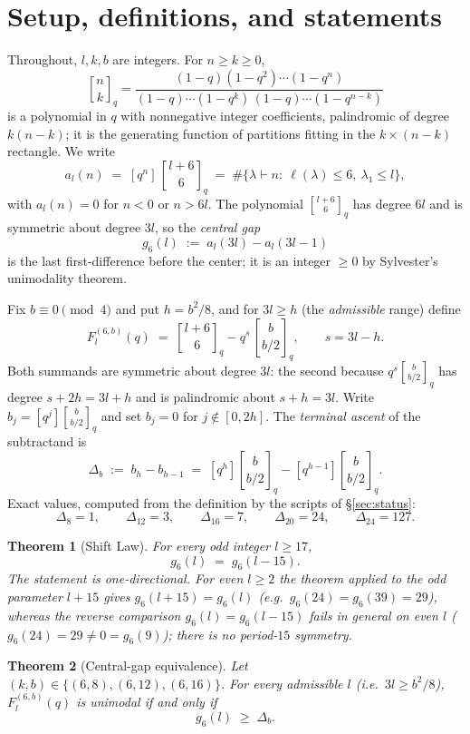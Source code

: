 \documentclass[11pt,reqno]{article}
\newtheorem{theorem}{Theorem}
\theoremstyle{definition}
\newcommand{\ggbrack}[2]{\genfrac{[}{]}{0pt}{}{#1}{#2}_q}
\begin{document}
\section{Setup, definitions, and statements}\label{sec:setup}
Throughout, $l,k,b$ are integers. For $n\ge k\ge 0$,
\[
\ggbrack{n}{k}=\frac{(1-q)(1-q^2)\cdots(1-q^{n})}{(1-q)\cdots(1-q^{k})\,(1-q)\cdots(1-q^{n-k})}
\]
is a polynomial in $q$ with nonnegative integer coefficients, palindromic of degree $k(n-k)$; it is the generating function of partitions fitting in the $k\times(n-k)$ rectangle. We write
\[
a_l(n)\;=\;[q^n]\,\ggbrack{l+6}{6}\;=\;\#\{\lambda\vdash n:\ \ell(\lambda)\le 6,\ \lambda_1\le l\},
\]
with $a_l(n)=0$ for $n<0$ or $n>6l$. The polynomial $\ggbrack{l+6}{6}$ has degree $6l$ and is symmetric about degree $3l$, so the \emph{central gap}
\[
g_6(l)\;:=\;a_l(3l)-a_l(3l-1)
\]
is the last first-difference before the center; it is an integer $\ge 0$ by Sylvester's unimodality theorem.

Fix $b\equiv 0\pmod 4$ and put $h=b^2/8$, and for $3l\ge h$ (the \emph{admissible} range) define
\[
F^{(6,b)}_l(q)\;=\;\ggbrack{l+6}{6}-q^{s}\,\ggbrack{b}{b/2},\qquad s=3l-h .
\]
Both summands are symmetric about degree $3l$: the second because $q^s\ggbrack{b}{b/2}$ has degree $s+2h=3l+h$ and is palindromic about $s+h=3l$. Write $b_j=[q^j]\ggbrack{b}{b/2}$ and set $b_j=0$ for $j\notin[0,2h]$. The \emph{terminal ascent} of the subtractand is
\begin{equation}\label{eq:Delta}
\Delta_b\;:=\;b_h-b_{h-1}
\;=\;[q^h]\ggbrack{b}{b/2}-[q^{h-1}]\ggbrack{b}{b/2} .
\end{equation}
Exact values, computed from the definition by the scripts of \S\ref{sec:status}:
\begin{equation}\label{eq:Deltatable}
\Delta_8=1,\qquad \Delta_{12}=3,\qquad \Delta_{16}=7,\qquad \Delta_{20}=24,\qquad \Delta_{24}=127 .
\end{equation}

\begin{theorem}[Shift Law]\label{thm:shift}
For every odd integer $l\ge 17$,
\[
g_6(l)\;=\;g_6(l-15).
\]
The statement is one-directional. For even $l\ge2$ the theorem applied to the odd parameter $l+15$ gives $g_6(l+15)=g_6(l)$ (e.g.\ $g_6(24)=g_6(39)=29$), whereas the reverse comparison $g_6(l)=g_6(l-15)$ fails in general on even $l$ ($g_6(24)=29\ne 0=g_6(9)$); there is no period-$15$ symmetry.
\end{theorem}

\begin{theorem}[Central-gap equivalence]\label{thm:equivalence}
Let $(k,b)\in\{(6,8),(6,12),(6,16)\}$. For every admissible $l$ (i.e.\ $3l\ge b^2/8$), $F^{(6,b)}_l(q)$ is unimodal if and only if
\[
g_6(l)\;\ge\;\Delta_b .
\]
\end{theorem}
\end{document}
